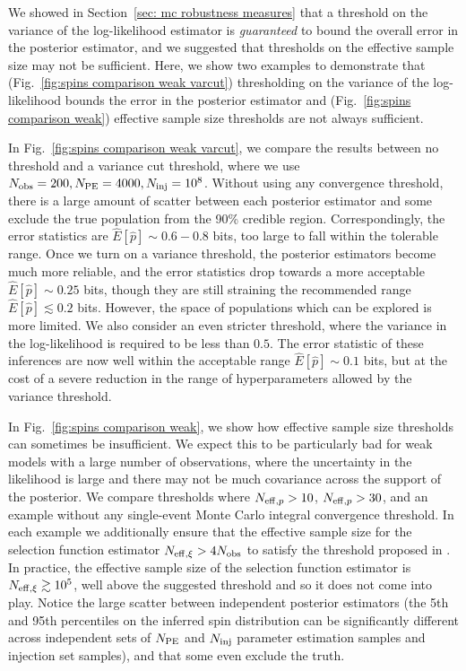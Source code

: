 We showed in Section~\ref{sec: mc robustness measures} that a threshold on the variance of the log-likelihood estimator is \textit{guaranteed} to bound the overall error in the posterior estimator, and we suggested that thresholds on the effective sample size may not be sufficient. Here, we show two examples to demonstrate that (Fig.~\ref{fig:spins comparison weak varcut}) thresholding on the variance of the log-likelihood bounds the error in the posterior estimator and (Fig.~\ref{fig:spins comparison weak}) effective sample size thresholds are not always sufficient. 

In Fig.~\ref{fig:spins comparison weak varcut}, we compare the results between no threshold and a variance cut threshold, where we use $N_{\rm obs} = 200, N_{\rm PE} = 4000, N_{\rm inj} = 10^8$. Without using any convergence threshold, there is a large amount of scatter between each posterior estimator and some exclude the true population from the 90\% credible region. Correspondingly, the error statistics are $\hat{E}[\hat{p}]\sim 0.6-0.8$ bits, too large to fall within the tolerable range. Once we turn on a variance threshold, the posterior estimators become much more reliable, and the error statistics drop towards a more acceptable $\hat{E}[\hat{p}] \sim 0.25$ bits, though they are still straining the recommended range $\hat{E}[\hat{p}] \lesssim0.2$ bits. However, the space of populations which can be explored is more limited. 
We also consider an even stricter threshold, where the variance in the log-likelihood is required to be less than $0.5$. The error statistic of these inferences are now well within the acceptable range $\hat{E}[\hat{p}] \sim 0.1$ bits, but at the cost of a severe reduction in the range of hyperparameters allowed by the variance threshold.

In Fig.~\ref{fig:spins comparison weak}, we show how effective sample size thresholds can sometimes be insufficient. We expect this to be particularly bad for weak models with a large number of observations, where the uncertainty in the likelihood is large and there may not be much covariance across the support of the posterior. 
We compare thresholds where $N_{{\rm eff}, p} > 10$, $N_{{\rm eff}, p} > 30$, and an example without any single-event Monte Carlo integral convergence threshold. In each example we additionally ensure that the effective sample size for the selection function estimator $N_{{\rm eff},\xi} > 4N_{\rm obs}$ to satisfy the threshold proposed in \citet{Farr:2019rap}. In practice, the effective sample size of the selection function estimator is $N_{{\rm eff},\xi} \gtrsim 10^5$, well above the suggested threshold and so it does not come into play. Notice the large scatter between independent posterior estimators (the 5th and 95th percentiles on the inferred spin distribution can be significantly different across independent sets of $N_{\rm PE}$ and $N_{\rm inj}$ parameter estimation samples and injection set samples), and that some even exclude the truth.





